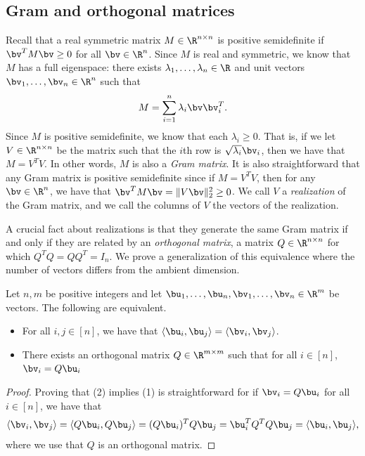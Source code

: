 {\subsection{Gram and orthogonal matrices}\label{subsec:gram-ortho}
Recall that a real symmetric matrix $M \in \R^{n \times n}$ is positive semidefinite if $\bv^{T} M \bv \ge 0$ for all $\bv \in \R^n$. Since $M$ is real and symmetric, we know that $M$ has a full eigenspace: there exists $\lambda_1, \hdots, \lambda_n \in \R$ and unit vectors $\bv_1, \hdots, \bv_n \in \R^n$ such that 
\[
M = \sum_{i=1}^n \lambda_i \bv \bv_i^{T}.
\]
Since $M$ is positive semidefinite, we know that each $\lambda_i \ge 0$. That is, if we let $V \in \R^{n \times n}$ be the matrix such that the $i$th row is $\sqrt{\lambda_i} \bv_i$, then we have that $M = V^{T} V$. In other words, $M$ is also a \emph{Gram matrix}. It is also straightforward that any Gram matrix is positive semidefinite since if $M = V^{T} V$, then for any $\bv \in \R^n$, we have that $\bv^{T} M \bv = \|V \bv\|_2^2 \ge 0$. We call $V$ a \emph{realization} of the Gram matrix, and we call the columns of $V$ the vectors of the realization.

A crucial fact about realizations is that they generate the same Gram matrix if and only if they are related by an \emph{orthogonal matrix}, a matrix $Q \in \R^{n \times n}$ for which $Q^{T} Q = Q Q^{T} = I_n$. We prove a generalization of this equivalence where the number of vectors differs from the ambient dimension.

\begin{proposition}\label{prop:gram-ortho}
Let $n, m$ be positive integers and let $\bu_1, \hdots, \bu_n, \bv_1, \hdots, \bv_n \in \R^m$ be vectors. The following are equivalent.
\begin{itemize}
\item [(1)] For all $i,j \in [n]$, we have that $\langle \bu_i, \bu_j\rangle = \langle \bv_i, \bv_j \rangle$.
\item [(2)] There exists an orthogonal matrix $Q \in \R^{m \times m}$ such that for all $i \in [n]$, $\bv_i = Q \bu_i$
\end{itemize}
\end{proposition}
\begin{proof}
Proving that (2) implies (1) is straightforward for if $\bv_i = Q\bu_i$ for all $i \in [n]$, we have that
\[
    \langle \bv_i, \bv_j\rangle = \langle Q\bu_i, Q\bu_j\rangle = (Q\bu_i)^{T} Q\bu_j = \bu_i^{T} Q^T Q \bu_j = \langle \bu_i, \bu_j\rangle,
\]
where we use that $Q$ is an orthogonal matrix.


\end{proof}}
